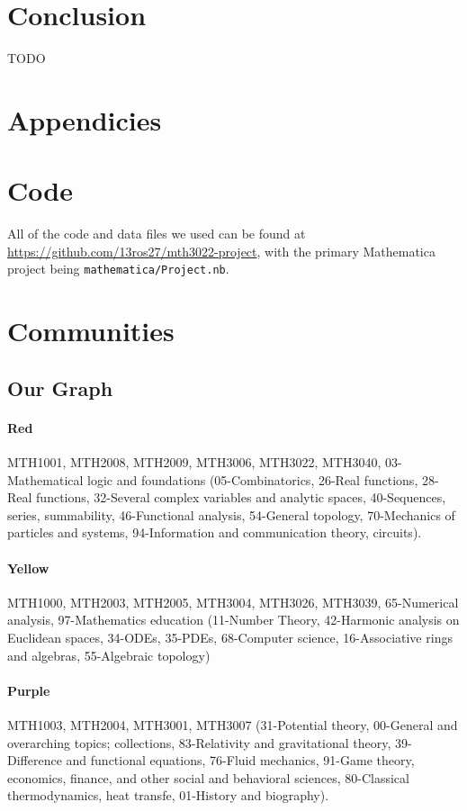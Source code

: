 \documentclass[english, 12pt]{article}
\begin{document}
\section{Conclusion}
TODO
\newpage
\printbibliography

\section*{Appendicies}
\parskip=0.0pt
\appendix
\section{Code}
All of the code and data files we used can be found at \url{https://github.com/13ros27/mth3022-project}, with the primary Mathematica project being \texttt{mathematica/Project.nb}.

\section{Communities}
\subsection{Our Graph} \label{app:our_graph_communities}
\paragraph{Red} MTH1001, MTH2008, MTH2009, MTH3006, MTH3022, MTH3040,  03-Mathematical logic and foundations (05-Combinatorics, 26-Real functions, 28-Real functions, 32-Several complex variables and analytic spaces, 40-Sequences, series, summability, 46-Functional analysis, 54-General topology, 70-Mechanics of particles and systems, 94-Information and communication theory, circuits).
\parskip=-16.0pt
\paragraph{Yellow} MTH1000, MTH2003, MTH2005, MTH3004, MTH3026, MTH3039, 65-Numerical analysis, 97-Mathematics education (11-Number Theory, 42-Harmonic analysis on Euclidean spaces, 34-ODEs, 35-PDEs, 68-Computer science, 16-Associative rings and algebras, 55-Algebraic topology)
\paragraph{Purple} MTH1003, MTH2004, MTH3001, MTH3007 (31-Potential theory, 00-General and overarching topics; collections, 83-Relativity and gravitational theory, 39-Difference and functional equations, 76-Fluid mechanics, 91-Game theory, economics, finance, and other social and behavioral sciences, 80-Classical thermodynamics, heat transfe, 01-History and biography).
\end{document}
